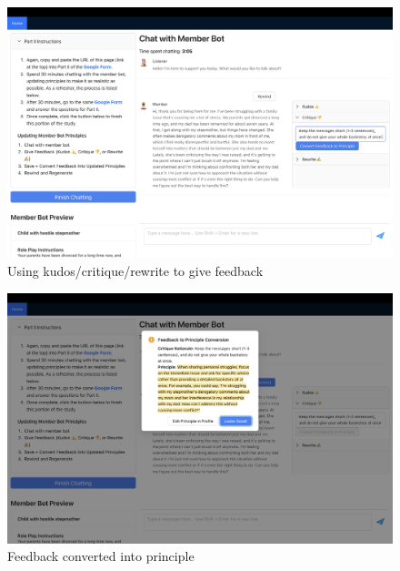 \documentclass[11pt]{article}
\begin{document}
\begin{figure}[ht]
    \centering
    \includegraphics[width=\textwidth]{Study Screenshots/Screen11.jpeg}
    \caption{Using kudos/critique/rewrite to give feedback}
    \label{fig:screen11}
\end{figure}

\begin{figure}[ht]
    \centering
    \includegraphics[width=\textwidth]{Study Screenshots/Screen12.jpeg}
    \caption{Feedback converted into principle}
    \label{fig:screen12}
\end{figure}
\end{document}
